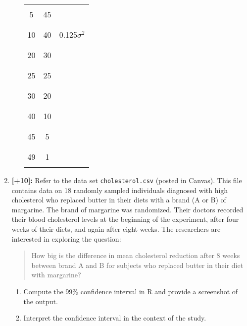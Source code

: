 \documentclass[11pt]{article}
\begin{document}
\begin{enumerate}
\begin{enumerate}
\begin{center}
\begin{tabular}{c|c|c}
			\hline
			&& \\
			5 & 45 & \\
			&& \\
			\hline
			&& \\
			10 & 40 & 0.125$\sigma^2$ \\
			&& \\
			\hline
			&& \\
			20 & 30 & \\
			&& \\
			\hline
			&& \\
			25 & 25 & \\
			&& \\
			\hline
			&& \\
			30 & 20 & \\
			&& \\
			\hline
			&& \\
			40 & 10 & \\
			&& \\
			\hline
			&& \\
			45 & 5 & \\
			&& \\
			\hline
			&& \\
			49 & 1 & \\
			&&
		\end{tabular}
	\end{center}
	\vspace{1in}
	\end{enumerate}
	
\item \textbf{[+10]:} Refer to the data set \texttt{cholesterol.csv} (posted in Canvas). This file contains data on 18 randomly sampled individuals diagnosed with high cholesterol who replaced butter in their diets with a brand (A or B) of margarine. The brand of margarine was randomized. Their doctors recorded their blood cholesterol levels at the beginning of the experiment, after four weeks of their diets, and again after eight weeks. The researchers are interested in exploring the question: 
	\begin{quote}
		How big is the difference in mean cholesterol reduction after 8 weeks between brand A and B for subjects who replaced butter in their diet with  margarine?
	\end{quote} 
	\begin{enumerate}
	\item Compute the 99\% confidence interval in R and provide a screenshot of the output. 
	\vspace{4in}
	\item Interpret the confidence interval in the context of the study.
	\vspace{3.25in}
	\end{enumerate}
	

\end{enumerate}
\end{document}
